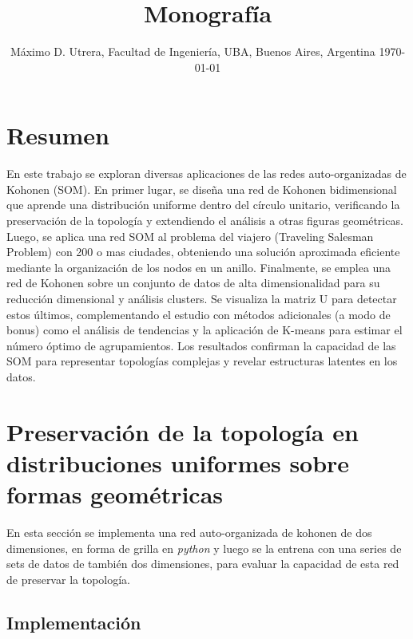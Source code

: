 \title{\textbf{Monografía}}
\author{\small Máximo D. Utrera, Facultad de Ingeniería, UBA, Buenos Aires, Argentina \hfill \small \today}
\date{} %

\twocolumn[
\begin{@twocolumnfalse}
  \maketitle
  \thispagestyle{fancy}
\end{@twocolumnfalse}
]

\section*{Resumen}

En este trabajo se exploran diversas aplicaciones de las redes auto-organizadas de Kohonen (SOM). En primer lugar, se diseña una red de Kohonen bidimensional que aprende una distribución uniforme dentro del círculo unitario, verificando la preservación de la topología y extendiendo el análisis a otras figuras geométricas. Luego, se aplica una red SOM al problema del viajero (Traveling Salesman Problem) con 200 o mas ciudades, obteniendo una solución aproximada eficiente mediante la organización de los nodos en un anillo. Finalmente, se emplea una red de Kohonen sobre un conjunto de datos de alta dimensionalidad para su reducción dimensional y análisis clusters. Se visualiza la matriz U para detectar estos últimos, complementando el estudio con métodos adicionales (a modo de bonus) como el análisis de tendencias y la aplicación de K-means para estimar el número óptimo de agrupamientos. Los resultados confirman la capacidad de las SOM para representar topologías complejas y revelar estructuras latentes en los datos.
\vspace{0.25cm}

\section{Preservación de la topología en distribuciones uniformes sobre formas geométricas}

En esta sección se implementa una red auto-organizada de kohonen de dos dimensiones, en forma de grilla en \textit{python} y luego se la entrena con una series de sets de datos de también dos dimensiones, para evaluar la capacidad de esta red de preservar la topología.

\subsection{Implementación}

